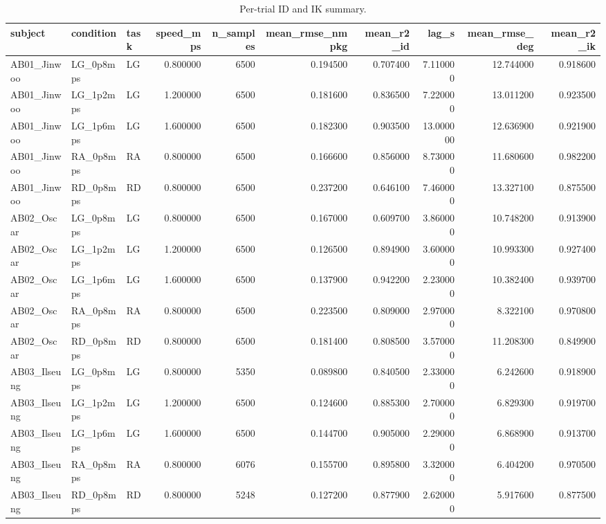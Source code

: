 \begin{table}
\caption{Per-trial ID and IK summary.}
\label{tab:table5_combined_per_trial}
\begin{tabular}{lllrrrrrrr}
\toprule
subject & condition & task & speed\_mps & n\_samples & mean\_rmse\_nmpkg & mean\_r2\_id & lag\_s & mean\_rmse\_deg & mean\_r2\_ik \\
\midrule
AB01\_Jinwoo & LG\_0p8mps & LG & 0.800000 & 6500 & 0.194500 & 0.707400 & 7.110000 & 12.744000 & 0.918600 \\
AB01\_Jinwoo & LG\_1p2mps & LG & 1.200000 & 6500 & 0.181600 & 0.836500 & 7.220000 & 13.011200 & 0.923500 \\
AB01\_Jinwoo & LG\_1p6mps & LG & 1.600000 & 6500 & 0.182300 & 0.903500 & 13.000000 & 12.636900 & 0.921900 \\
AB01\_Jinwoo & RA\_0p8mps & RA & 0.800000 & 6500 & 0.166600 & 0.856000 & 8.730000 & 11.680600 & 0.982200 \\
AB01\_Jinwoo & RD\_0p8mps & RD & 0.800000 & 6500 & 0.237200 & 0.646100 & 7.460000 & 13.327100 & 0.875500 \\
AB02\_Oscar & LG\_0p8mps & LG & 0.800000 & 6500 & 0.167000 & 0.609700 & 3.860000 & 10.748200 & 0.913900 \\
AB02\_Oscar & LG\_1p2mps & LG & 1.200000 & 6500 & 0.126500 & 0.894900 & 3.600000 & 10.993300 & 0.927400 \\
AB02\_Oscar & LG\_1p6mps & LG & 1.600000 & 6500 & 0.137900 & 0.942200 & 2.230000 & 10.382400 & 0.939700 \\
AB02\_Oscar & RA\_0p8mps & RA & 0.800000 & 6500 & 0.223500 & 0.809000 & 2.970000 & 8.322100 & 0.970800 \\
AB02\_Oscar & RD\_0p8mps & RD & 0.800000 & 6500 & 0.181400 & 0.808500 & 3.570000 & 11.208300 & 0.849900 \\
AB03\_Ilseung & LG\_0p8mps & LG & 0.800000 & 5350 & 0.089800 & 0.840500 & 2.330000 & 6.242600 & 0.918900 \\
AB03\_Ilseung & LG\_1p2mps & LG & 1.200000 & 6500 & 0.124600 & 0.885300 & 2.700000 & 6.829300 & 0.919700 \\
AB03\_Ilseung & LG\_1p6mps & LG & 1.600000 & 6500 & 0.144700 & 0.905000 & 2.290000 & 6.868900 & 0.913700 \\
AB03\_Ilseung & RA\_0p8mps & RA & 0.800000 & 6076 & 0.155700 & 0.895800 & 3.320000 & 6.404200 & 0.970500 \\
AB03\_Ilseung & RD\_0p8mps & RD & 0.800000 & 5248 & 0.127200 & 0.877900 & 2.620000 & 5.917600 & 0.877500 \\

\end{tabular}
\end{table}
